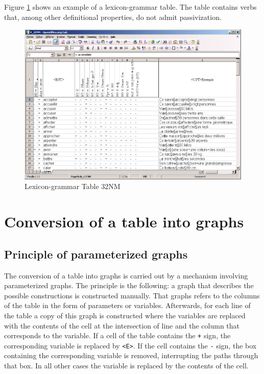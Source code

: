 \bigskip
\noindent Figure \ref{fig-table-32NM} shows an example of a lexicon-grammar table.
The table contains verbs that, among other definitional properties, do not admit
passivization.

\begin{figure}[!ht]
\begin{center}
\includegraphics[width=15cm]{resources/img/fig8-1.png}
\caption{Lexicon-grammar Table 32NM\label{fig-table-32NM}}
\end{center}
\end{figure}

\section{Conversion of a table into graphs}
\subsection{Principle of parameterized graphs}
The conversion of a table into graphs is carried out by a mechanism involving
parameterized graphs. The principle is the following: a graph that describes the
possible constructions is constructed manually. That graphs refers to the columns
of the table in the form of parameters or variables. Afterwards, for each line of
the table a copy of this graph is constructed where the variables are replaced
with the contents of the cell at the intersection of line and the column that
corresponds to the variable. If a cell of the table contains the \verb$+$ sign,
the corresponding variable is replaced by \verb+<E>+. If the cell contains the
\verb+-+ sign,  the box containing the corresponding variable is removed,
interrupting the paths through that box. In all other cases the variable is
replaced by the contents of the cell.


